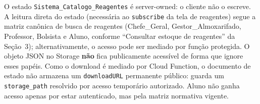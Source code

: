 \begin{regra}
O estado \texttt{Sistema\_Catalogo\_Reagentes} é server-owned: o cliente não o escreve. A leitura direta do estado (necessária ao \texttt{subscribe} da tela de reagentes) segue a matriz canônica de busca de reagentes (Chefe\_Geral, Gestor\_Almoxarifado, Professor, Bolsista e Aluno, conforme ``Consultar estoque de reagentes'' da Seção~3); alternativamente, o acesso pode ser mediado por função protegida. O objeto JSON no Storage \textbf{não} fica publicamente acessível de forma que ignore esses papéis. Como o download é mediado por Cloud Function, o documento de estado não armazena um \texttt{downloadURL} permanente público: guarda um \texttt{storage\_path} resolvido por acesso temporário autorizado. Aluno não ganha acesso apenas por estar autenticado, mas pela matriz normativa vigente.
\end{regra}
